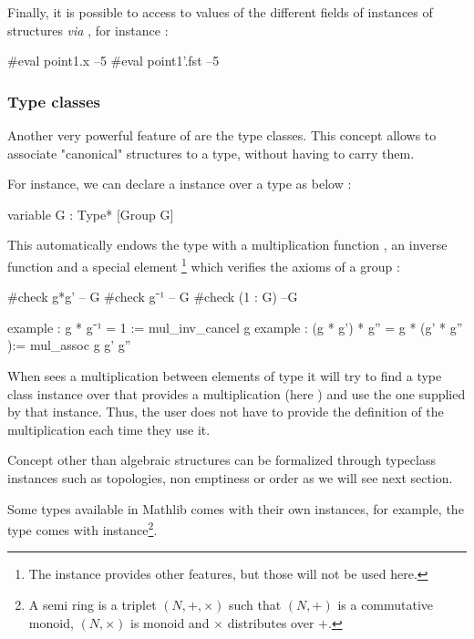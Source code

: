 Finally, it is possible to access to values of the different fields of instances of structures \textit{via} , for instance :
\begin{leancode}
#eval point1.x --5
#eval point1'.fst --5 
\end{leancode}

\subsubsection{Type classes}
Another very powerful feature of \Lean are the type classes. This concept allows to associate %
"canonical" structures to a type, without having to carry them.

For instance, we can declare a  instance over a type  as below :

\begin{leancode}
variable {G : Type*} [Group G]
\end{leancode}

This automatically endows the type  with a multiplication function , an inverse function  and a special element  \footnote{The  instance provides other features, but those will not be used here.} which verifies the axioms of a group :

\begin{leancode}
#check g*g' -- G
#check g⁻¹ -- G
#check (1 : G) --G

example : g * g⁻¹ = 1 := mul_inv_cancel g
example : (g * g') * g'' = g * (g' * g'' ):= mul_assoc g g' g''
\end{leancode}

When \Lean sees a multiplication between elements of type  it will try to find a type class instance over  that provides a multiplication (here ) and use the one supplied by that instance. Thus, the user does not have to provide the definition of the multiplication each time they use it.

Concept other than algebraic structures can be formalized through typeclass instances such as topologies, non emptiness or order as we will see next section.

Some types available in Mathlib comes with their own instances, for example, the type  comes with  instance\footnote{A semi ring is a triplet $\left( N, +, \times  \right)$ such that $\left( N,+ \right)$ is a commutative monoid, $\left( N, \times  \right)$ is monoid and $\times $ distributes over $+$.}.


